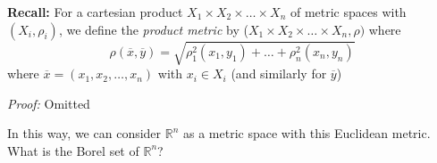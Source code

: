 \documentclass[12pt]{article}
\newcommand{\R}{\mathbb{R}}
\renewcommand{\bar}[1]{\overline{#1}}
\newenvironment*{tbox}[2][gray]{
    \begin{tcolorbox}[
        parbox=false,
        colback=#1!5!white,
        colframe=#1!75!black,
        breakable,
        title={#2}
    ]}
    {\end{tcolorbox}}
\begin{document}
    \textbf{Recall:} For a cartesian product $X_1 \times X_2 \times \dots \times X_n$ of metric spaces with $(X_i, \rho_i)$, we define the \emph{product metric} by ($X_1 \times X_2 \times \dots \times X_n, \rho)$ where 
    \[\rho(\bar x, \bar y) = \sqrt{\rho_1^2(x_1, y_1) + \dots + \rho_n^2(x_n, y_n)}\]
    where $\bar x = (x_1, x_2, \dots, x_n)$ with $x_i \in X_i$ (and similarly for $\bar y$)

    \begin{tbox}{\textbf{Proposition:} 
        \[\lim_{m \to \infty} \rho(\bar x, \bar y) = 0 \iff \lim_{m \to \infty} \rho_i(x_i^m, y_i^m) = 0\]}
        \emph{Proof:} Omitted
    \end{tbox}

    In this way, we can consider $\R^n$ as a metric space with this Euclidean metric. What is the Borel set of $\R^n$?
\end{document}
